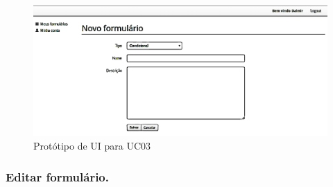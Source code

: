 \documentclass[11pt]{article}
\begin{document}
        \begin{figure}[h!]
          \centering
          \includegraphics[width=.9\textwidth]{new_form.png}
          \caption{Protótipo de UI para UC03}
        \end{figure}

    \clearpage
      
      \subsubsection{Editar formulário.}
\end{document}
